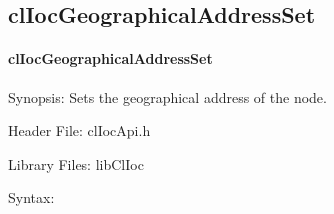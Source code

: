 \begin{flushleft}
\subsection{clIocGeographicalAddressSet}
\hypertarget{pageIOC126}{}\paragraph{cl\-Ioc\-Geographical\-Address\-Set}\label{pageIOC126}
\begin{Desc}
\item[Synopsis: ]Sets the geographical address of the node.\end{Desc}
\begin{Desc}
\item[Header File:]clIocApi.h\end{Desc}
\begin{Desc}
\item[Library Files:]libClIoc\end{Desc}
\begin{Desc}
\item[Syntax: ]


\end{Desc}
\end{flushleft}
